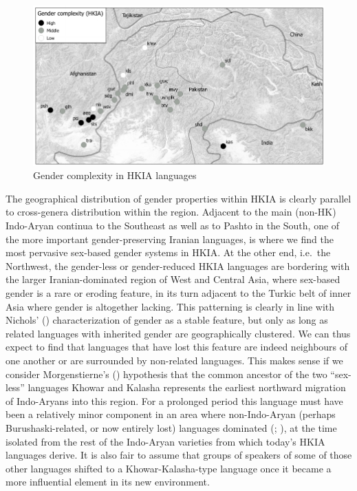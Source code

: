 \documentclass[output=collectionpaper]{langsci/langscibook}
\begin{document}
\begin{figure}
\includegraphics[width=\textwidth]{figures/10/map3_2}
\caption{Gender complexity in HKIA languages}
\label{fig:Lilje:3}
\end{figure}

The geographical distribution of gender properties within HKIA is clearly parallel to cross-genera distribution within the region. Adjacent to the main (non-HK) Indo-Aryan continua to the Southeast as well as to Pashto in the South, one of the more important gender-preserving Iranian languages, is where we find the most pervasive sex-based gender systems in HKIA. At the other end, i.e.\ the Northwest, the gender-less or gender-reduced HKIA languages are bordering with the larger Iranian-dominated region of West and Central Asia, where sex-based gender is a rare or eroding feature, in its turn adjacent to the Turkic belt of inner Asia where gender is altogether lacking. This patterning is clearly in line with Nichols' (\citealt*[303]{Nichols2003}) characterization of gender as a stable feature, but only as long as related languages with inherited gender are geographically clustered. We can thus expect to find that languages that have lost this feature are indeed neighbours of one another or are surrounded by non-related languages. This makes sense if we consider Morgenstierne's (\citealt*[51]{Morgenstierne1932}) hypothesis that the common ancestor of the two ``sex-less'' languages Khowar and Kalasha represents the earliest northward migration of Indo-Aryans into this region. For a prolonged period this language must have been a relatively minor component in an area where non-Indo-Aryan (perhaps Burushaski-related, or now entirely lost) languages dominated (\citealt{Tikkanen1988}; \citealt[92--94]{Parpola2002}), at the time isolated from the rest of the Indo-Aryan varieties from which today's HKIA languages derive. It is also fair to assume that groups of speakers of some of those other languages shifted to a Khowar-Kalasha-type language once it became a more influential element in its new environment.
\end{document}
